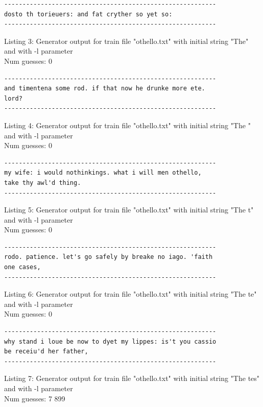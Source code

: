 \documentclass{article}
\begin{document}
\begin{lstlisting}
----------------------------------------------------------
dosto th torieuers: and fat cryther so yet so:
----------------------------------------------------------
\end{lstlisting}

Listing 3: Generator output for train file "othello.txt" with initial string "The" and with -l parameter
\\Num guesses: 0

\begin{lstlisting}
----------------------------------------------------------
and timentena some rod. if that now he drunke more ete. 
lord?
----------------------------------------------------------
\end{lstlisting}

Listing 4: Generator output for train file "othello.txt" with initial string "The " and with -l parameter
\\Num guesses: 0

\begin{lstlisting}
----------------------------------------------------------
my wife: i would nothinkings. what i will men othello, 
take thy awl'd thing.
----------------------------------------------------------
\end{lstlisting}

Listing 5: Generator output for train file "othello.txt" with initial string "The t" and with -l parameter
\\Num guesses: 0

\begin{lstlisting}
----------------------------------------------------------
rodo. patience. let's go safely by breake no iago. 'faith 
one cases,
----------------------------------------------------------
\end{lstlisting}

Listing 6: Generator output for train file "othello.txt" with initial string "The te" and with -l parameter
\\Num guesses: 0

\begin{lstlisting}
----------------------------------------------------------
why stand i loue be now to dyet my lippes: is't you cassio 
be receiu'd her father,
----------------------------------------------------------
\end{lstlisting}

Listing 7: Generator output for train file "othello.txt" with initial string "The tes" and with -l parameter
\\Num guesses: 7 899
\end{document}
